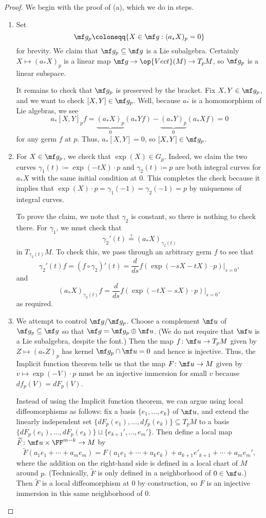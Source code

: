 \documentclass[../notes.tex]{subfiles}
\begin{document}
\begin{proof}
	We begin with the proof of (a), which we do in steps.
	\begin{enumerate}
		\item Set
		\[\mf g_p\coloneqq\{X\in\mf g:(a_*X)_p=0\}\]
		for brevity. We claim that $\mf g_p\subseteq\mf g$ is a Lie subalgebra. Certainly $X\mapsto (a_*X)_p$ is a linear map $\mf g\to\op{Vect}(M)\to T_pM$, so $\mf g_p$ is a linear subspace.
		
		It remains to check that $\mf g_p$ is preserved by the bracket. Fix $X,Y\in\mf g_p$, and we want to check $[X,Y]\in\mf g_p$. Well, because $a_*$ is a homomorphism of Lie algebras, we see
		\[a_*[X,Y]_pf=\underbrace{(a_*X)_p}_0(a_*Yf)-\underbrace{(a_*Y)_p}_0(a_*Xf)=0\]
		for any germ $f$ at $p$. Thus, $a_*[X,Y]=0$, so $[X,Y]\in\mf g_p$.

		\item For $X\in\mf g_p$, we check that $\exp(X)\in G_p$. Indeed, we claim the two curves $\gamma_1(t)\coloneqq \exp(-tX)\cdot p$ and $\gamma_2(t)\coloneqq p$ are both integral curves for $a_*X$ with the same initial condition at $0$. This completes the check because it implies that $\exp(X)\cdot p=\gamma_1(-1)=\gamma_2(-1)=p$ by uniqueness of integral curves.
		
		To prove the claim, we note that $\gamma_2$ is constant, so there is nothing to check there. For $\gamma_1$, we must check that
		\[\gamma_2'(t)\stackrel?=(a_*X)_{\gamma_2(t)}\]
		in $T_{\gamma_2(t)}M$. To check this, we pass through an arbitrary germ $f$ to see that
		\[\gamma_2'(t)f=(f\circ\gamma_2)'(t)=\frac d{ds}f(\exp(-sX-tX)\cdot p)\bigg|_{s=0},\]
		and
		\[(a_*X)_{\gamma_2(t)}f=\frac d{ds}f(\exp(-tX-sX)\cdot p)\bigg|_{s=0},\]
		as required.
		
		\item We attempt to control $\mf g/\mf g_p$. Choose a complement $\mf u$ of $\mf g_p\subseteq\mf g$ so that $\mf g=\mf g_p\oplus\mf u$. (We do not require that $\mf u$ is a Lie subalgebra, despite the font.) Then the map $f\colon\mf u\to T_pM$ given by $Z\mapsto(a_*Z)_p$ has kernel $\mf g_p\cap\mf u=0$ and hence is injective. Thus, the Implicit function theorem tells us that the map $F\colon\mf u\to M$ given by $v\mapsto\exp(-V)\cdot p$ must be an injective immersion for small $v$ because $df_p(V)=dF_p(V)$.
		
		Instead of using the Implicit function theorem, we can argue using local diffeomorphisms as follows: fix a basis $\{e_1,\ldots,e_k\}$ of $\mf u$, and extend the linearly independent set $\{dF_p(e_1),\ldots,df_p(e_k)\}\subseteq T_pM$ to a basis $\{dF_p(e_1),\ldots,dF_p(e_k)\}\sqcup\{e_{k+1}',\ldots,e_m'\}$. Then define a local map $\widetilde F\colon\mf u\times\FF^{m-k}\to M$ by
		\[\widetilde F(a_1e_1+\cdots+a_me_m)=F(a_1e_1+\cdots+a_ke_k)+a_{k+1}e'_{k+1}+\cdots+a_me_m',\]
		where the addition on the right-hand side is defined in a local chart of $M$ around $p$. (Technically, $\widetilde F$ is only defined in a neighborhood of $0\in\mf u$.) Then $\widetilde F$ is a local diffeomorphism at $0$ by construction, so $F$ is an injective immersion in this same neighborhood of $0$.


\end{enumerate}
\end{proof}
\end{document}
